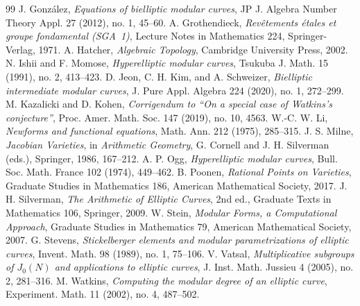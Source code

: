 \documentclass[12pt, letterpaper]{amsart}
\theoremstyle{definition}
\theoremstyle{remark}
\numberwithin{equation}{section}
\begin{document}
\begin{thebibliography}{99}
 J. Gonz\'alez, \emph{Equations of bielliptic modular curves}, JP J. Algebra Number Theory Appl. 27 (2012), no. 1, 45--60.
 A. Grothendieck, \emph{Rev\^etements \'etales et groupe fondamental (SGA~1)}, Lecture Notes in Mathematics 224, Springer-Verlag, 1971.
 A. Hatcher, \emph{Algebraic Topology}, Cambridge University Press, 2002.
 N. Ishii and F. Momose, \emph{Hyperelliptic modular curves}, Tsukuba J. Math. 15 (1991), no. 2, 413--423.
 D. Jeon, C. H. Kim, and A. Schweizer, \emph{Bielliptic intermediate modular curves}, J. Pure Appl. Algebra 224 (2020), no. 1, 272--299.
 M. Kazalicki and D. Kohen, \emph{Corrigendum to ``On a special case of Watkins's conjecture''}, Proc. Amer. Math. Soc. 147 (2019), no. 10, 4563.
 W.-C. W. Li, \emph{Newforms and functional equations}, Math. Ann. 212 (1975), 285--315.
 J. S. Milne, \emph{Jacobian Varieties}, in \emph{Arithmetic Geometry}, G. Cornell and J. H. Silverman (eds.), Springer, 1986, 167--212.
 A. P. Ogg, \emph{Hyperelliptic modular curves}, Bull. Soc. Math. France 102 (1974), 449--462.
 B. Poonen, \emph{Rational Points on Varieties}, Graduate Studies in Mathematics 186, American Mathematical Society, 2017.
 J. H. Silverman, \emph{The Arithmetic of Elliptic Curves}, 2nd ed., Graduate Texts in Mathematics 106, Springer, 2009.
 W. Stein, \emph{Modular Forms, a Computational Approach}, Graduate Studies in Mathematics 79, American Mathematical Society, 2007.
 G. Stevens, \emph{Stickelberger elements and modular parametrizations of elliptic curves}, Invent. Math. 98 (1989), no. 1, 75--106.
 V. Vatsal, \emph{Multiplicative subgroups of $J_0(N)$ and applications to elliptic curves}, J. Inst. Math. Jussieu 4 (2005), no. 2, 281--316.
 M. Watkins, \emph{Computing the modular degree of an elliptic curve}, Experiment. Math. 11 (2002), no. 4, 487--502.
\end{thebibliography}
\end{document}
